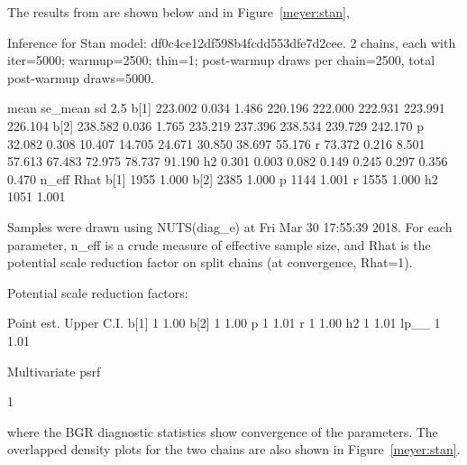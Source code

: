 \documentclass[article]{jss}
\begin{document}
The results from  are shown below and in
Figure~\ref{meyer:stan},
%
\begin{Schunk}
\begin{Soutput}
Inference for Stan model: df0c4ce12df598b4fcdd553dfe7d2cee.
2 chains, each with iter=5000; warmup=2500; thin=1; 
post-warmup draws per chain=2500, total post-warmup draws=5000.
 
        mean se_mean     sd    2.5%
b[1] 223.002   0.034  1.486 220.196 222.000 222.931 223.991 226.104
b[2] 238.582   0.036  1.765 235.219 237.396 238.534 239.729 242.170
p     32.082   0.308 10.407  14.705  24.671  30.850  38.697  55.176
r     73.372   0.216  8.501  57.613  67.483  72.975  78.737  91.190
h2     0.301   0.003  0.082   0.149   0.245   0.297   0.356   0.470
     n_eff  Rhat
b[1]  1955 1.000
b[2]  2385 1.000
p     1144 1.001
r     1555 1.000
h2    1051 1.001

Samples were drawn using NUTS(diag_e) at Fri Mar 30 17:55:39 2018.
For each parameter, n_eff is a crude measure of effective sample size,
and Rhat is the potential scale reduction factor on split chains (at 
convergence, Rhat=1).

Potential scale reduction factors:

     Point est. Upper C.I.
b[1]          1       1.00
b[2]          1       1.00
p             1       1.01
r             1       1.00
h2            1       1.01
lp__          1       1.01

Multivariate psrf

1
\end{Soutput}
\end{Schunk}
%
where the BGR diagnostic statistics show convergence of the
parameters.  The overlapped density plots for the two chains are also
shown in Figure~\ref{meyer:stan}.
\end{document}
